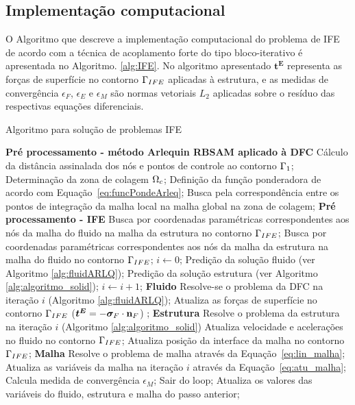 \subsection{Implementação computacional} 

O Algoritmo que descreve a implementação computacional do problema de IFE de acordo com a técnica de acoplamento forte do tipo bloco-iterativo é apresentada no Algoritmo. \ref{alg:IFE}. No algoritmo apresentado $\boldsymbol{t^{E}}$ representa as forças de superfície no contorno $\Gamma_{IFE}$ aplicadas à estrutura, e as medidas de convergência $\epsilon_F$, $\epsilon_E$ e $\epsilon_M$ são normas vetoriais $L_2$ aplicadas sobre o resíduo das respectivas equações diferenciais.

\begin{algorithm}
	\caption{Algoritmo para solução de problemas IFE}
	\label{alg:IFE}
	\begin{algorithmic}[1]
		\State \textbf{Pré processamento - método Arlequin RBSAM aplicado à DFC}
		\State Cálculo da distância assinalada dos nós e pontos de controle ao contorno $\Gamma_1$;
		\State Determinação da zona de colagem $\Omega_c$;
		\State Definição da função ponderadora de acordo com Equação~\eqref{eq:funcPondeArleq};
		\State Busca pela correspondência entre os pontos de integração da malha local na malha global na zona de colagem;
		\State \textbf{Pré processamento - IFE}
		\State Busca por coordenadas paramétricas correspondentes aos nós da malha do fluido na malha da estrutura no contorno $\Gamma_{IFE}$;
		\State Busca por coordenadas paramétricas correspondentes aos nós da malha da estrutura na malha do fluido no contorno $\Gamma_{IFE}$;
		\State $i \gets 0$;
		\State Predição da solução fluido (ver Algoritmo \ref{alg:fluidARLQ});
		\State Predição da solução estrutura (ver Algoritmo \ref{alg:algoritmo_solid});		
		\State $i\gets i+1$;
		\State \textbf{Fluido}
		\State Resolve-se o problema da DFC na iteração $i$ (Algoritmo \ref{alg:fluidARLQ});
		\State Atualiza as forças de superfície no contorno  $\Gamma_{IFE}$ ($\boldsymbol{t^{E}} = -\boldsymbol{\sigma}_{F} \cdot \mathbf{n}_{F}$) ;
		\State \textbf{Estrutura}
		\State Resolve o problema da estrutura na iteração $i$ (Algoritmo \ref{alg:algoritmo_solid})
		\State Atualiza velocidade e acelerações no fluido no contorno  $\Gamma_{IFE}$;
		\State Atualiza posição da interface da malha no contorno  $\Gamma_{IFE}$;
		\State \textbf{Malha}
		\State Resolve o problema de malha através da Equação~\eqref{eq:lin_malha};
		\State Atualiza as variáveis da malha na iteração $i$ através da Equação~\eqref{eq:atu_malha};
		\State Calcula medida de convergência $\epsilon_M$;
		\State Sair do loop;
		\EndIf
		\EndWhile
		\State Atualiza os valores das variáveis do fluido, estrutura e malha do passo anterior;
		\EndFor
	\end{algorithmic}
\end{algorithm}

